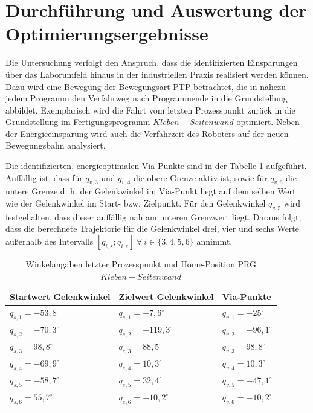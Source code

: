 \section{Durchführung und Auswertung der Optimierungsergebnisse}
Die Untersuchung verfolgt den Anspruch, dass die identifizierten Einsparungen über das Laborumfeld hinaus in der industriellen Praxis realisiert werden können. Dazu wird eine Bewegung der Bewegungsart PTP betrachtet, die in nahezu jedem Programm den Verfahrweg nach Programmende in die Grundstellung abbildet. Exemplarisch wird die Fahrt vom letzten Prozesspunkt zurück in die Grundstellung im Fertigungsprogramm  $Kleben-Seitenwand$  optimiert. Neben der Energieeinsparung wird auch die Verfahrzeit des Roboters auf der neuen Bewegungsbahn analysiert.

Die identifizierten, energieoptimalen Via-Punkte sind in der Tabelle \ref{tab:optviapunkte} aufgeführt. Auffällig ist, dass für $q_{v,3}$ und $q_{v,4}$ die obere Grenze aktiv ist, sowie für $q_{v,6}$ die untere Grenze d. h. der Gelenkwinkel im Via-Punkt liegt auf dem selben Wert wie der Gelenkwinkel im Start- bzw. Zielpunkt. Für den Gelenkwinkel $q_{v,5}$ wird festgehalten, dass dieser auffällig nah am unteren Grenzwert liegt. Daraus folgt, dass die berechnete Trajektorie für die Gelenkwinkel drei, vier und sechs Werte außerhalb des Intervalls $[q_{i,s};q_{i,e}] ~\forall~ i \in \{3,4,5,6\}$ annimmt. 
\\
\begin{table}
	\centering
	\begin{tabular}{|l|l|l|}
		\hline
		Startwert Gelenkwinkel&  Zielwert Gelenkwinkel&  Via-Punkte\\
		\hline
		$q_{s,1} = -53,8$			&  $q_{e,1} = -7,6^{\circ}$  		&$q_{v,1} = -25^{\circ}$  \\
		\hline
		$q_{s,2} = -70,3^{\circ}$	&  $q_{e,2} = -119,3^{\circ}$    	&$q_{v,2} = -96,1^{\circ}$  \\
		\hline
		$q_{s,3} = 98,8^{\circ}$	&  $q_{e,3} = 88,5^{\circ}$ 		&$q_{v,3} = 98,8^{\circ}$  \\
		\hline
		$q_{s,4} = -69,9^{\circ}$	&  $q_{e,4} = 10,3^{\circ}$ 		&$q_{v,4} = 10,3^{\circ}$  \\
		\hline
		$q_{s,5} = -58,7^{\circ}$	&  $q_{e,5} = 32,4^{\circ}$  		&$q_{v,5} = -47,1^{\circ}$  \\
		\hline
		$q_{s,6} = 55,7^{\circ}$	&  $q_{e,6} = -10,2^{\circ}$ 		&$q_{v,6} = -10,2^{\circ}$  \\
		\hline
	\end{tabular}
	\caption{Winkelangaben letzter Prozesspunkt und Home-Position PRG $Kleben-Seitenwand$}
	\label{tab:optviapunkte}
\end{table}
